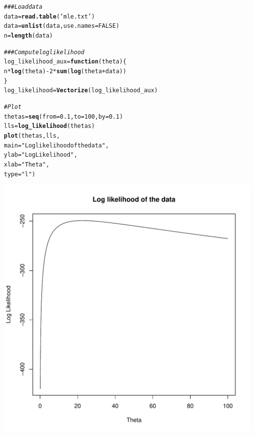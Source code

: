 \documentclass[11pt]{article}\usepackage[]{graphicx}\usepackage[]{color}
\makeatletter
\def\maxwidth{ %
  \ifdim\Gin@nat@width>\linewidth
    \linewidth
  \else
    \Gin@nat@width
  \fi
}
\newcommand{\hlnum}[1]{\textcolor[rgb]{0.686,0.059,0.569}{#1}}%
\newcommand{\hlstr}[1]{\textcolor[rgb]{0.192,0.494,0.8}{#1}}%
\newcommand{\hlcom}[1]{\textcolor[rgb]{0.678,0.584,0.686}{\textit{#1}}}%
\newcommand{\hlopt}[1]{\textcolor[rgb]{0,0,0}{#1}}%
\newcommand{\hlstd}[1]{\textcolor[rgb]{0.345,0.345,0.345}{#1}}%
\newcommand{\hlkwa}[1]{\textcolor[rgb]{0.161,0.373,0.58}{\textbf{#1}}}%
\newcommand{\hlkwb}[1]{\textcolor[rgb]{0.69,0.353,0.396}{#1}}%
\newcommand{\hlkwc}[1]{\textcolor[rgb]{0.333,0.667,0.333}{#1}}%
\newcommand{\hlkwd}[1]{\textcolor[rgb]{0.737,0.353,0.396}{\textbf{#1}}}%
\newenvironment{kframe}{%
 \def\at@end@of@kframe{}%
 \ifinner\ifhmode%
  \def\at@end@of@kframe{\end{minipage}}%
  \begin{minipage}{\columnwidth}%
 \fi\fi%
 \def\FrameCommand##1{\hskip\@totalleftmargin \hskip-\fboxsep
 \colorbox{shadecolor}{##1}\hskip-\fboxsep
     \hskip-\linewidth \hskip-\@totalleftmargin \hskip\columnwidth}%
 \MakeFramed {\advance\hsize-\width
   \@totalleftmargin\z@ \linewidth\hsize
   \@setminipage}}%
 {\par\unskip\endMakeFramed%
 \at@end@of@kframe}
\newenvironment{knitrout}{}{} %
\makeatother
\begin{document}
\begin{knitrout}
\color{fgcolor}\begin{kframe}
\begin{alltt}
\hlcom{## # Load data}
\hlstd{data} \hlkwb{=} \hlkwd{read.table}\hlstd{(}\hlstr{'mle.txt'}\hlstd{)}
\hlstd{data} \hlkwb{=} \hlkwd{unlist}\hlstd{(data,} \hlkwc{use.names} \hlstd{=} \hlnum{FALSE}\hlstd{)}
\hlstd{n} \hlkwb{=} \hlkwd{length}\hlstd{(data)}

\hlcom{## # Compute log likelihood}
\hlstd{log_likelihood_aux} \hlkwb{=} \hlkwa{function}\hlstd{(}\hlkwc{theta}\hlstd{)\{}
  \hlstd{n}\hlopt{*}\hlkwd{log}\hlstd{(theta)} \hlopt{-} \hlnum{2}\hlopt{*}\hlkwd{sum}\hlstd{(}\hlkwd{log}\hlstd{(theta}\hlopt{+}\hlstd{data))}
\hlstd{\}}
\hlstd{log_likelihood} \hlkwb{=} \hlkwd{Vectorize}\hlstd{(log_likelihood_aux)}

\hlcom{# Plot}
\hlstd{thetas} \hlkwb{=} \hlkwd{seq}\hlstd{(}\hlkwc{from} \hlstd{=} \hlnum{0.1}\hlstd{,} \hlkwc{to} \hlstd{=} \hlnum{100}\hlstd{,} \hlkwc{by} \hlstd{=} \hlnum{0.1}\hlstd{)}
\hlstd{lls} \hlkwb{=} \hlkwd{log_likelihood}\hlstd{(thetas)}
\hlkwd{plot}\hlstd{(thetas,lls,}
     \hlkwc{main} \hlstd{=} \hlstr{"Log likelihood of the data"}\hlstd{,}
     \hlkwc{ylab} \hlstd{=} \hlstr{"Log Likelihood"}\hlstd{,}
     \hlkwc{xlab} \hlstd{=} \hlstr{"Theta"}\hlstd{,}
     \hlkwc{type}\hlstd{=}\hlstr{"l"}\hlstd{)}
\end{alltt}
\end{kframe}
\includegraphics[width=\maxwidth]{figure/unnamed-chunk-1-1} 

\end{knitrout}
\end{document}
